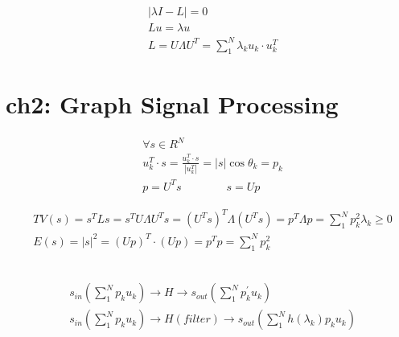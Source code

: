 \documentclass{article}
\begin{document}
%
\begin{align*}
    & | \lambda I - L | = 0  \\[3pt]
    & L u = \lambda u  \\[3pt]
    & L = U \Lambda U^{T} = \sum_{1}^{N} \lambda_{k} u_{k} \cdot u_{k}^{T} 
\end{align*}


\newpage
\section*{ch2: Graph Signal Processing}


%
\begin{align*}
    & \forall s \in R^{N}  \\[3pt]
    & u_{k}^{T} \cdot s 
      = \frac{u_{k}^{T} \cdot s}{|u_{k}^{T}|} 
      = |s| \cos \theta_{k} = p_{k}  \\[3pt]
    & p = U^{T} s \qquad \qquad s = U p 
\end{align*}

%
\begin{align*}
    & TV(s) = s^{T} L s = s^{T} U \Lambda U^{T} s 
      = ( U^{T} s )^{T} \Lambda ( U^{T} s ) 
      = p^{T} \Lambda p 
      = \sum_{1}^{N} p_{k}^{2} \lambda_{k} \ge 0  \\[3pt]
    & E(s) = |s|^{2} = ( U p )^{T} \cdot ( U p ) 
      = p^{T} p = \sum_{1}^{N} p_{k}^{2} 
\end{align*}

~ \\[3pt]
\begin{align*}
    & s_{in} \left ( \sum_{1}^{N} p_{k} {u_{k}} \right )
      \to H \to 
      s_{out} \left ( \sum_{1}^{N} p_{k}^{'} {u_{k}} \right )  \\[3pt]
    & s_{in} \left ( \sum_{1}^{N} p_{k} {u_{k}} \right )
      \to H(filter) \to 
      s_{out} \left ( \sum_{1}^{N} h(\lambda_{k}) p_{k} u_{k} \right )  \\[3pt]
\end{align*}
\end{document}
